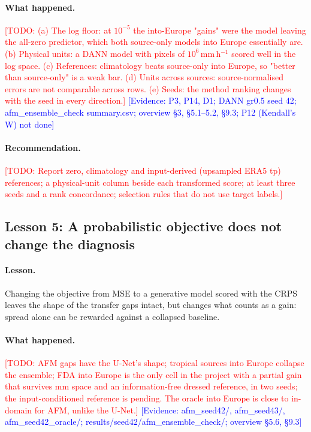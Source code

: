 \documentclass{article}
\newcommand{\todo}[1]{\textcolor{red}{[TODO: #1]}}
\newcommand{\ev}[1]{\textcolor{blue}{[Evidence: #1]}}
\begin{document}
\paragraph{What happened.} \todo{(a) The log floor: at $10^{-5}$ the
into-Europe "gains" were the model leaving the all-zero predictor, which
both source-only models into Europe essentially are. (b) Physical units:
a DANN model with pixels of $10^{6}$\,mm\,h$^{-1}$ scored well in the log
space. (c) References: climatology beats source-only into Europe, so
"better than source-only" is a weak bar. (d) Units across sources:
source-normalised errors are not comparable across rows. (e) Seeds: the
method ranking changes with the seed in every direction.}
\ev{P3, P14, D1; DANN gr0.5 seed 42; afm\_ensemble\_check summary.csv;
overview \S3, \S5.1--5.2, \S9.3; P12 (Kendall's W) not done}

\paragraph{Recommendation.} \todo{Report zero, climatology and
input-derived (upsampled ERA5 tp) references; a physical-unit column
beside each transformed score; at least three seeds and a rank
concordance; selection rules that do not use target labels.}


\subsection{Lesson 5: A probabilistic objective does not change the
diagnosis}\label{sec:L5}

\paragraph{Lesson.} Changing the objective from MSE to a generative model
scored with the CRPS leaves the shape of the transfer gaps intact, but
changes what counts as a gain: spread alone can be rewarded against a
collapsed baseline.

\paragraph{What happened.} \todo{AFM gaps have the U-Net's shape; tropical
sources into Europe collapse the ensemble; FDA into Europe is the only
cell in the project with a partial gain that survives mm space and an
information-free dressed reference, in two seeds; the input-conditioned
reference is pending. The oracle into Europe is close to in-domain for
AFM, unlike the U-Net.}
\ev{afm\_seed42/, afm\_seed43/, afm\_seed42\_oracle/;
results/seed42/afm\_ensemble\_check/; overview \S5.6, \S9.3}
\end{document}
